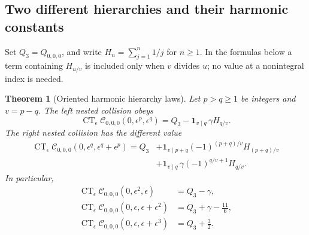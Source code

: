 \documentclass[11pt,a4paper]{article}
\numberwithin{equation}{section}
\newtheorem{theorem}{Theorem}[section]
\theoremstyle{definition}
\theoremstyle{remark}
\DeclareMathOperator{\CT}{CT}
\begin{document}
\subsection{Two different hierarchies and their harmonic constants}

Set $Q_3=Q_{0,0,0}$, and write $H_n=\sum_{j=1}^n1/j$ for $n\ge1$.
In the formulas below a term containing $H_{u/v}$ is included only
when $v$ divides $u$; no value at a nonintegral index is needed.

\begin{theorem}[Oriented harmonic hierarchy laws]\label{hc:hierarchy}
Let $p>q\ge1$ be integers and $v=p-q$. The left nested collision obeys
\begin{equation}\label{hc:left}
 \boxed{\quad
 \CT_{\epsilon}\mathcal C_{0,0,0}(0,\epsilon^p,\epsilon^q)
   =Q_3-\mathbf1_{v\mid q}\,\gamma H_{q/v}.
 \quad}
\end{equation}
The right nested collision has the different value
\begin{equation}
 \boxed{\begin{aligned}
 \CT_{\epsilon}\mathcal C_{0,0,0}
           (0,\epsilon^q,\epsilon^q+\epsilon^p)
 =Q_3
 &+\mathbf1_{v\mid p+q}(-1)^{(p+q)/v}H_{(p+q)/v}
 \\[-2pt]
 &+\mathbf1_{v\mid q}\,\gamma(-1)^{q/v+1}H_{q/v}.
 \end{aligned}}\label{hc:right}
\end{equation}
In particular,
\begin{align}
 \CT_{\epsilon}\mathcal C_{0,0,0}(0,\epsilon^2,\epsilon)
     &=Q_3-\gamma,\label{hc:left-example}\\
 \CT_{\epsilon}\mathcal C_{0,0,0}(0,\epsilon,\epsilon+\epsilon^2)
     &=Q_3+\gamma-\frac{11}{6},\label{hc:right-example}\\
 \CT_{\epsilon}\mathcal C_{0,0,0}(0,\epsilon,\epsilon+\epsilon^3)
     &=Q_3+\frac32.\label{hc:right-second}
\end{align}
\end{theorem}
\end{document}
